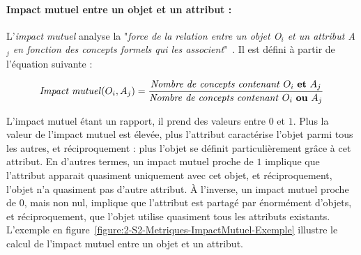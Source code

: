 

\paragraph{Impact mutuel entre un objet et un attribut :}
\label{mystep:Contexte:ACF-MetriquesTreillis-ImpactMutuel}

L'\textit{impact mutuel} analyse la "\textit{force de la relation entre un objet O$_{i}$ et un attribut A$_{j}$ en fonction des concepts formels qui les associent}"~\cite{jaffal2019aide}.
Il est défini à partir de l'équation suivante :

\bigskip

\begin{equation}
\text{\textit{Impact mutuel}}(O_{i}, A_{j}) = \frac{\text{\textit{Nombre de concepts contenant} } O_{i} \text{ \textbf{et} } A_{j}}{\text{\textit{Nombre de concepts contenant} } O_{i} \text{ \textbf{ou} } A_{j}}
\label{equation:2-S2-Metriques-ImpactMutuel}
\end{equation}


\bigskip %

L'impact mutuel étant un rapport, il prend des valeurs entre $ 0 $ et $ 1 $.
Plus la valeur de l'impact mutuel est élevée, plus l'attribut caractérise l'objet parmi tous les autres, et réciproquement : plus l'objet se définit particulièrement grâce à cet attribut.
En d'autres termes, un impact mutuel proche de $ 1 $ implique que l'attribut apparait quasiment uniquement avec cet objet, et réciproquement, l'objet n'a quasiment pas d'autre attribut.
À l'inverse, un impact mutuel proche de $ 0 $, mais non nul, implique que l'attribut est partagé par énormément d'objets, et réciproquement, que l'objet utilise quasiment tous les attributs existants.
L'exemple en figure~\ref{figure:2-S2-Metriques-ImpactMutuel-Exemple} illustre le calcul de l'impact mutuel entre un objet et un attribut.

